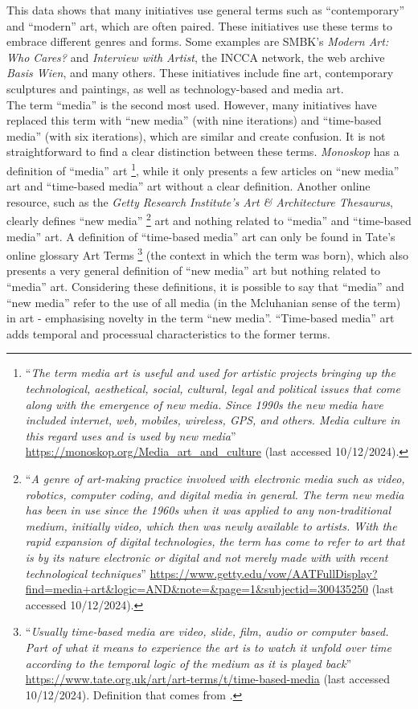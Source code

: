 This data shows that many initiatives use general terms such as ``contemporary'' and ``modern'' art, which are often paired. These initiatives use these terms to embrace different genres and forms. Some examples are SMBK’s \textit{Modern Art: Who Cares?} and \textit{Interview with Artist}, the INCCA network, the web archive \textit{Basis Wien}, and many others. These initiatives include fine art, contemporary sculptures and paintings, as well as technology-based and media art.\\
The term ``media'' is the second most used. However, many initiatives have replaced this term with ``new media'' (with nine iterations) and ``time-based media'' (with six iterations), which are similar and create confusion. It is not straightforward to find a clear distinction between these terms. \textit{Monoskop} has a definition of ``media'' art \footnote{``\textit{The term media art is useful and used for artistic projects bringing up the technological, aesthetical, social, cultural, legal and political issues that come along with the emergence of new media. Since 1990s the new media have included internet, web, mobiles, wireless, GPS, and others. Media culture in this regard uses and is used by new media}” \url{https://monoskop.org/Media_art_and_culture} (last accessed 10/12/2024).}, while it only presents a few articles on ``new media'' art and ``time-based media'' art without a clear definition. Another online resource, such as the \textit{Getty Research Institute's Art \& Architecture Thesaurus}, clearly defines ``new media'' \footnote{``\textit{A genre of art-making practice involved with electronic media such as video, robotics, computer coding, and digital media in general. The term new media has been in use since the 1960s when it was applied to any non-traditional medium, initially video, which then was newly available to artists. With the rapid expansion of digital technologies, the term has come to refer to art that is by its nature electronic or digital and not merely made with with recent technological techniques}” \url{https://www.getty.edu/vow/AATFullDisplay?find=media+art&logic=AND&note=&page=1&subjectid=300435250} (last accessed 10/12/2024).} art and nothing related to ``media'' and ``time-based media'' art. A definition of ``time-based media'' art can only be found in Tate's online glossary Art Terms \footnote{``\textit{Usually time-based media are video, slide, film, audio or computer based. Part of what it means to experience the art is to watch it unfold over time according to the temporal logic of the medium as it is played back}” \url{https://www.tate.org.uk/art/art-terms/t/time-based-media} (last accessed 10/12/2024). Definition that comes from \cite{laurenson2006authenticity}.} (the context in which the term was born), which also presents a very general definition of ``new media'' art but nothing related to ``media'' art. Considering these definitions, it is possible to say that ``media'' and ``new media'' refer to the use of all media (in the Mcluhanian sense of the term) in art - emphasising novelty in the term ``new media''. ``Time-based media'' art adds temporal and processual characteristics to the former terms.\\  
